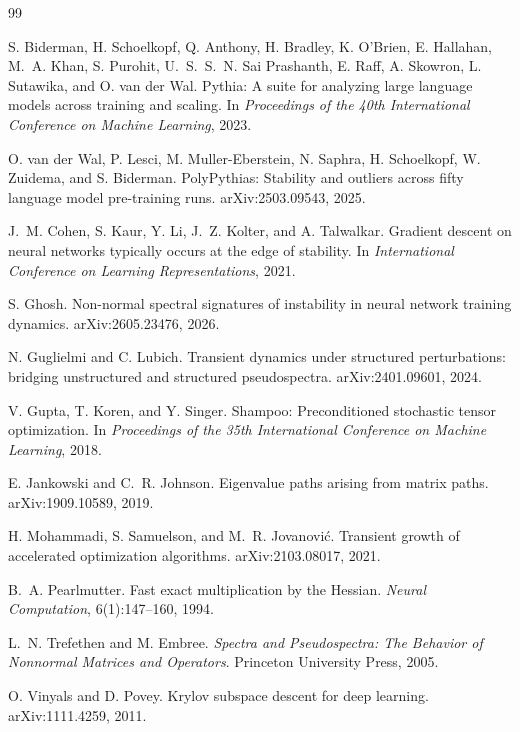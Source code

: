 \begin{thebibliography}{99}

S. Biderman, H. Schoelkopf, Q. Anthony, H. Bradley, K. O'Brien, E. Hallahan,
M.~A. Khan, S. Purohit, U.~S.~S.~N. Sai Prashanth, E. Raff, A. Skowron,
L. Sutawika, and O. van der Wal.
\newblock Pythia: A suite for analyzing large language models across training and scaling.
\newblock In \emph{Proceedings of the 40th International Conference on Machine Learning}, 2023.

O. van der Wal, P. Lesci, M. Muller-Eberstein, N. Saphra, H. Schoelkopf,
W. Zuidema, and S. Biderman.
\newblock PolyPythias: Stability and outliers across fifty language model pre-training runs.
\newblock arXiv:2503.09543, 2025.

J.~M. Cohen, S. Kaur, Y. Li, J.~Z. Kolter, and A. Talwalkar.
\newblock Gradient descent on neural networks typically occurs at the edge of stability.
\newblock In \emph{International Conference on Learning Representations}, 2021.

S. Ghosh.
\newblock Non-normal spectral signatures of instability in neural network training dynamics.
\newblock arXiv:2605.23476, 2026.

N. Guglielmi and C. Lubich.
\newblock Transient dynamics under structured perturbations: bridging unstructured and structured pseudospectra.
\newblock arXiv:2401.09601, 2024.

V. Gupta, T. Koren, and Y. Singer.
\newblock Shampoo: Preconditioned stochastic tensor optimization.
\newblock In \emph{Proceedings of the 35th International Conference on Machine Learning}, 2018.

E. Jankowski and C.~R. Johnson.
\newblock Eigenvalue paths arising from matrix paths.
\newblock arXiv:1909.10589, 2019.

H. Mohammadi, S. Samuelson, and M.~R. Jovanovi\'{c}.
\newblock Transient growth of accelerated optimization algorithms.
\newblock arXiv:2103.08017, 2021.

B.~A. Pearlmutter.
\newblock Fast exact multiplication by the Hessian.
\newblock \emph{Neural Computation}, 6(1):147--160, 1994.

L.~N. Trefethen and M. Embree.
\newblock \emph{Spectra and Pseudospectra: The Behavior of Nonnormal Matrices and Operators}.
\newblock Princeton University Press, 2005.

O. Vinyals and D. Povey.
\newblock Krylov subspace descent for deep learning.
\newblock arXiv:1111.4259, 2011.

\end{thebibliography}


